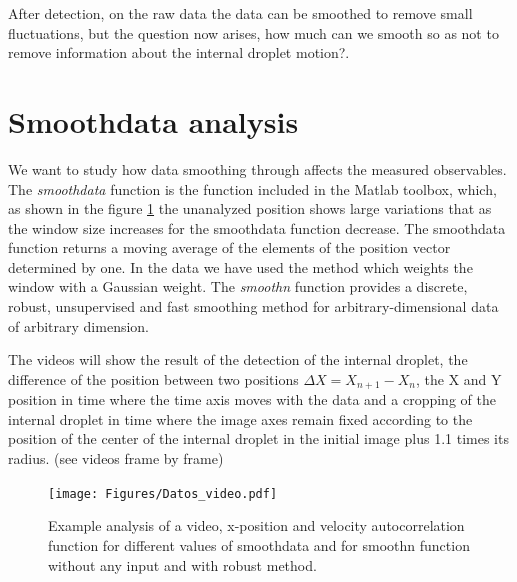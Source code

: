 \documentclass[%
10pt,
superscriptaddress,
twocolumn,
 amsmath,amssymb,
 aps,prx,
]{revtex4-2}
\begin{document}
After detection, on the raw data the data can be smoothed to remove small fluctuations, but the question now arises, how much can we smooth so as not to remove information about the internal droplet motion?.

\section{Smoothdata analysis}
\label{smoothdata}
We want to study how data smoothing through affects the measured observables. The \textit{smoothdata} function is the function included in the Matlab toolbox, which, as shown in the figure \ref{Datos_videos} the unanalyzed position shows large variations that as the window size increases for the smoothdata function decrease. The smoothdata function returns a moving average of the elements of the position vector determined by one. In the data we have used the  method which weights the window with a Gaussian weight.
The \textit{smoothn} function provides a discrete, robust, unsupervised and fast smoothing method for arbitrary-dimensional data of arbitrary dimension.

The videos will show the result of the detection of the internal droplet, the difference of the position between two positions $\Delta X = X_{n+1}-X_{n}$, the X and Y position in time where the time axis moves with the data and a cropping of the internal droplet in time where the image axes remain fixed according to the position of the center of the internal droplet in the initial image plus 1.1 times its radius. (see videos frame by frame)
\begin{figure}[b]
	\texttt{[image: Figures/Datos\_video.pdf]}
	\caption{Example analysis of a video, x-position and velocity autocorrelation function for different values of smoothdata and for smoothn function without any input and with robust method.}
	\label{Datos_videos}
\end{figure}


\onecolumngrid
\end{document}
